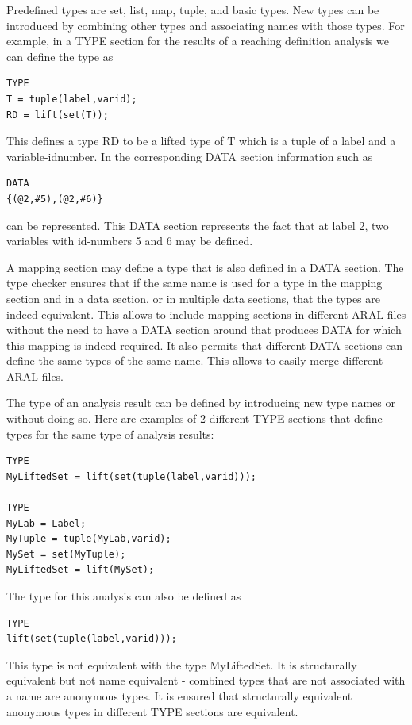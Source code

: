 \documentclass[a4paper,12pt]{report}
\begin{document}
Predefined types are set, list, map, tuple, and basic types. New types can be introduced by combining other types and associating names with those types.
For example, in a TYPE section for the results of a reaching definition analysis we can define the type as
\begin{verbatim}
TYPE
T = tuple(label,varid); 
RD = lift(set(T));
\end{verbatim}

This defines a type RD to be a lifted type of T which is a tuple of a label and a variable-idnumber. In the corresponding DATA section information such as 
\begin{verbatim}
DATA
{(@2,#5),(@2,#6)}
\end{verbatim}

can be represented. This DATA section represents the fact that at label 2, two variables with id-numbers 5 and 6 may be defined. 

A mapping section may define a type that is also defined in a DATA section. The type checker ensures that if the same name is used for a type in the mapping section and in a data section, or in multiple data sections, that the types are indeed equivalent. This allows to include mapping sections in different ARAL files without the need to have a DATA section around that produces DATA for which this mapping is indeed required. It also permits that different DATA sections can define the same types of the same name. This allows to easily merge different ARAL files.

The type of an analysis result can be defined by introducing new type names or without doing so. Here are examples of 2 different TYPE sections that define types for the same type of analysis results:

\begin{verbatim}
TYPE
MyLiftedSet = lift(set(tuple(label,varid)));

TYPE
MyLab = Label;
MyTuple = tuple(MyLab,varid);
MySet = set(MyTuple);
MyLiftedSet = lift(MySet);
\end{verbatim}

The type for this analysis can also be defined as 

\begin{verbatim}
TYPE
lift(set(tuple(label,varid)));
\end{verbatim}

This type is not equivalent with the type MyLiftedSet. It is structurally equivalent but not name equivalent - combined types that are not associated with a name are anonymous types. It is ensured that structurally equivalent anonymous types in different TYPE sections are equivalent.
\end{document}
